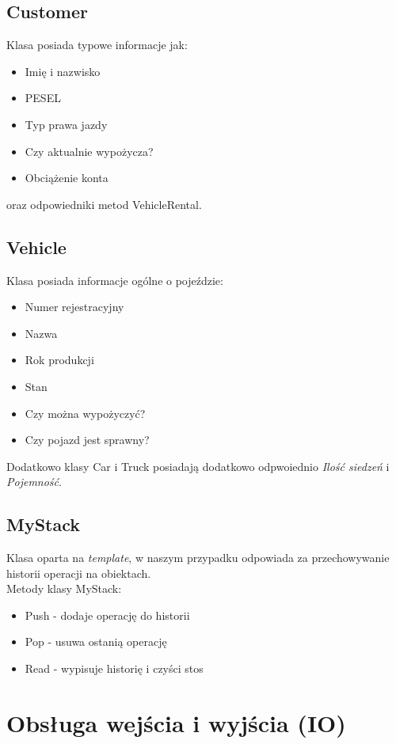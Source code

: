 \documentclass[10pt, a4paper] {article}
\begin{document}
\subsection{Customer}
Klasa posiada typowe informacje jak:
\begin {itemize}
	\item Imię i nazwisko
	\item PESEL
	\item Typ prawa jazdy
	\item Czy aktualnie wypożycza?
	\item Obciążenie konta
\end{itemize}


oraz odpowiedniki metod VehicleRental.
\subsection{Vehicle}
Klasa posiada informacje ogólne o pojeździe:
\begin{itemize}
	\item Numer rejestracyjny
	\item Nazwa
	\item Rok produkcji
	\item Stan
	\item Czy można wypożyczyć?
	\item Czy pojazd jest sprawny?
\end{itemize}


Dodatkowo klasy Car i Truck posiadają dodatkowo odpwoiednio \textit{Ilość siedzeń} i \textit{Pojemność}.

\subsection{MyStack}
Klasa oparta na \textit{template}, w naszym przypadku odpowiada za przechowywanie historii operacji na obiektach. \\


Metody klasy MyStack:
\begin{itemize}
	\item Push - dodaje operację do historii
	\item Pop - usuwa ostanią operację
	\item Read - wypisuje historię i czyści stos
\end{itemize}

\section{Obsługa wejścia i wyjścia (IO)}
\end{document}
